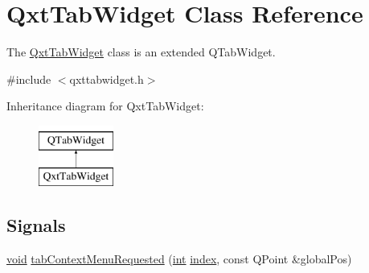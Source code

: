 \hypertarget{class_qxt_tab_widget}{\section{Qxt\-Tab\-Widget Class Reference}
\label{class_qxt_tab_widget}
}


The \hyperlink{class_qxt_tab_widget}{Qxt\-Tab\-Widget} class is an extended Q\-Tab\-Widget.  




{\ttfamily \#include $<$qxttabwidget.\-h$>$}

Inheritance diagram for Qxt\-Tab\-Widget\-:\begin{figure}[H]
\begin{center}
\leavevmode
\includegraphics[height=2.000000cm]{class_qxt_tab_widget}
\end{center}
\end{figure}
\subsection*{Signals}
\begin{DoxyCompactItemize}
\item 
\hyperlink{group___u_a_v_objects_plugin_ga444cf2ff3f0ecbe028adce838d373f5c}{void} \hyperlink{class_qxt_tab_widget_ad522fb334c56aa2e865508e042c74137}{tab\-Context\-Menu\-Requested} (\hyperlink{ioapi_8h_a787fa3cf048117ba7123753c1e74fcd6}{int} \hyperlink{glext_8h_ab47dd9958bcadea08866b42bf358e95e}{index}, const Q\-Point \&global\-Pos)
\end{DoxyCompactItemize}

